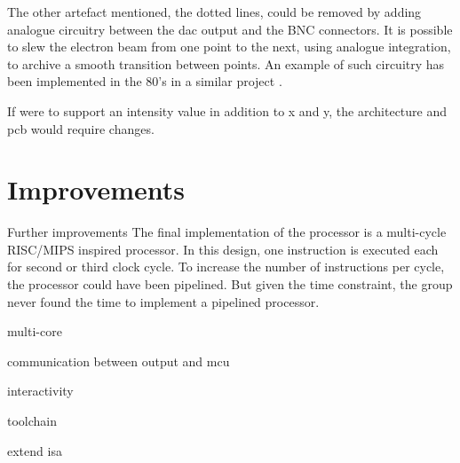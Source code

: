 The other artefact mentioned, the dotted lines, could be removed by adding analogue circuitry between the \gls{dac} output and the BNC connectors.
It is possible to slew the electron beam from one point to the next, using analogue integration, to archive a smooth transition between points.
An example of such circuitry has been implemented in the 80's in a similar project \cite{vector-graphic-crt}.

If \vthreek were to support an intensity value in addition to x and y, the architecture and \gls{pcb} would require changes.

\section{Improvements}
Further improvements 
The final implementation of the processor is a multi-cycle RISC/MIPS inspired processor.
In this design, one instruction is executed each for second or third clock cycle.
To increase the number of instructions per cycle, the processor could have been pipelined.
But given the time constraint, the group never found the time to implement a pipelined processor.

multi-core

communication between output and mcu

interactivity

toolchain

extend isa
